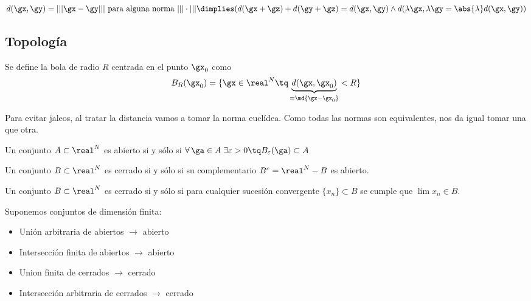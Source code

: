 \documentclass{apuntes}
\begin{document}
\begin{remark}
$d(\gx,\gy) = |||\gx-\gy||| \text{ para alguna norma }|||\cdot||| \dimplies (d(\gx+\gz)+d(\gy+\gz) = d(\gx,\gy) \wedge d(\lambda \gx,\lambda \gy = \abs{\lambda} d(\gx,\gy))$
\end{remark}

\subsection{Topología}
\begin{defn}[Bola] Se define la bola de radio $R$ centrada en el punto $\gx_0$ como 
\[B_R(\gx_0) =\{\gx \in \real^N \tq \underbrace{d(\gx,\gx_0)}_{=\md{\gx-\gx_0}} < R \} \]
\end{defn}


Para evitar jaleos, al tratar la distancia vamos a tomar la norma euclídea. Como todas las normas son equivalentes, nos da igual tomar una que otra.
\begin{defn} Un conjunto $A \subset \real^N$ es abierto si y sólo si $\forall\, \ga\in A\; \exists \varepsilon > 0 \tq B_\varepsilon(\ga) \subset A$
\end{defn}

\begin{defn} Un conjunto $B \subset \real^N$ es cerrado si y sólo si su complementario $B^c= \real^N-B$ es abierto.
\end{defn}

\begin{theorem} Un conjunto $B \subset \real^N$ es cerrado si y sólo si para cualquier sucesión convergente $\{x_n\} \subset B$ se cumple que  $\lim x_n \in B$. 
\end{theorem}

\begin{theorem}
Suponemos conjuntos de dimensión finita:
\begin{itemize}
 \item Unión arbitraria de abiertos $\rightarrow$ abierto
 \item Intersección finita de abiertos $\rightarrow$ abierto
 \item Union finita de cerrados $\rightarrow$ cerrado
 \item Intersección arbitraria de cerrados $\rightarrow$ cerrado
\end{itemize} 
\end{theorem}
\end{document}
